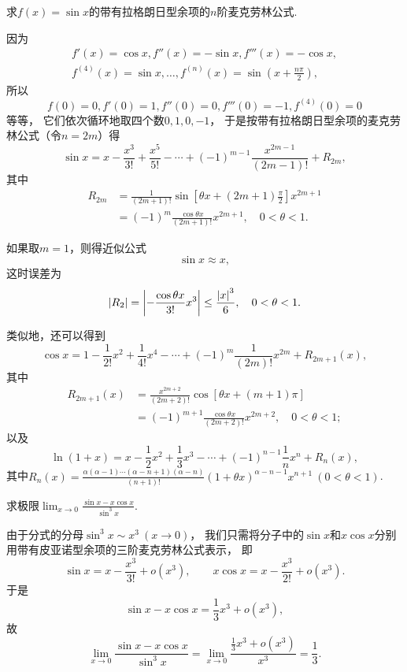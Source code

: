 \begin{example}
求\(f(x)=\sin x\)的带有拉格朗日型余项的\(n\)阶麦克劳林公式.
\begin{solution}
因为\begin{align*}
	f'(x)=\cos x,
	f''(x)=-\sin x,
	f'''(x)=-\cos x, \\
	f^{(4)}(x)=\sin x,
	\dotsc,
	f^{(n)}(x)=\sin\left(x+\frac{n\pi}{2}\right),
\end{align*}
所以\[
	f(0)=0,f'(0)=1,f''(0)=0,f'''(0)=-1,f^{(4)}(0)=0
\]等等，
它们依次循环地取四个数\(0,1,0,-1\)，
于是按带有拉格朗日型余项的麦克劳林公式（令\(n=2m\)）得\[
	\sin x = x - \frac{x^3}{3!} + \frac{x^5}{5!} - \dotsb + (-1)^{m-1} \frac{x^{2m-1}}{(2m-1)!} + R_{2m},
\]
其中\begin{align*}
	R_{2m}
	&= \frac{1}{(2m+1)!} \sin\left[\theta x + (2m+1)\frac{\pi}{2}\right] x^{2m+1} \\
	&= (-1)^m \frac{\cos \theta x}{(2m+1)!} x^{2m+1},
	\quad 0<\theta<1.
\end{align*}

如果取\(m=1\)，则得近似公式\[
	\sin x \approx x,
\]
这时误差为\[
	\abs{R_2} = \abs{-\frac{\cos \theta x}{3!} x^3}
	\leq \frac{\abs{x}^3}{6},
	\quad 0<\theta<1.
\]
\end{solution}
\end{example}

类似地，还可以得到\[
	\cos x
	= 1 - \frac{1}{2!} x^2
		+ \frac{1}{4!} x^4 - \dotsb
		+ (-1)^m \frac{1}{(2m)!} x^{2m}
		+ R_{2m+1}(x),
\]
其中\begin{align*}
	R_{2m+1}(x)
	&= \frac{x^{2m+2}}{(2m+2)!} \cos\left[\theta x + (m+1)\pi\right] \\
	&= (-1)^{m+1} \frac{\cos \theta x}{(2m+2)!} x^{2m+2},
	\quad 0<\theta<1;
\end{align*}
以及\[
	\ln(1+x)
	= x - \frac{1}{2} x^2 + \frac{1}{3} x^3 - \dotsb
		+ (-1)^{n-1} \frac{1}{n} x^n + R_n(x),
\]
其中\(R_n(x) = \frac{\alpha(\alpha-1)\dotsm(\alpha-n+1)(\alpha-n)}{(n+1)!}
(1+\theta x)^{\alpha-n-1} x^{n+1}\ (0<\theta<1)\).

\begin{example}
求极限\(\lim_{x\to0}\frac{\sin x - x \cos x}{\sin^3 x}\).
\begin{solution}
由于分式的分母\(\sin^3 x \sim x^3\ (x\to0)\)，
我们只需将分子中的\(\sin x\)和\(x \cos x\)分别用带有皮亚诺型余项的三阶麦克劳林公式表示，
即\[
	\sin x = x - \frac{x^3}{3!} + o(x^3),
	\qquad
	x \cos x = x - \frac{x^3}{2!} + o(x^3).
\]
于是\[
	\sin x - x \cos x = \frac{1}{3} x^3 + o(x^3),
\]
故\[
	\lim_{x\to0}\frac{\sin x - x \cos x}{\sin^3 x}
	= \lim_{x\to0}\frac{\frac{1}{3} x^3 + o(x^3)}{x^3} = \frac{1}{3}.
\]
\end{solution}
\end{example}

